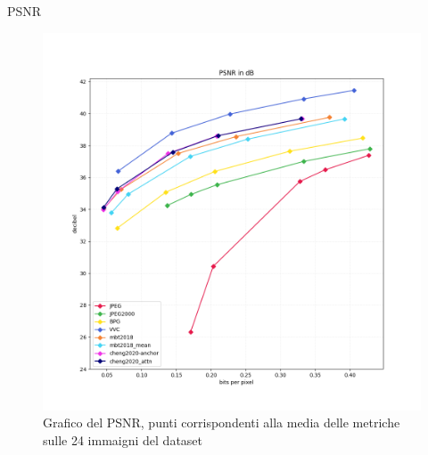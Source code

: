     \begin{frame}{PSNR}
        \begin{figure}[t!]
            \centering
            \includegraphics[width=0.57\textheight]{Immagini/METRICS/PSNR.png}
            \caption{Grafico del PSNR, punti corrispondenti alla media delle metriche sulle 24 immaigni del dataset}
            \label{fig:GraphPSNR}
        \end{figure}
    \end{frame}

